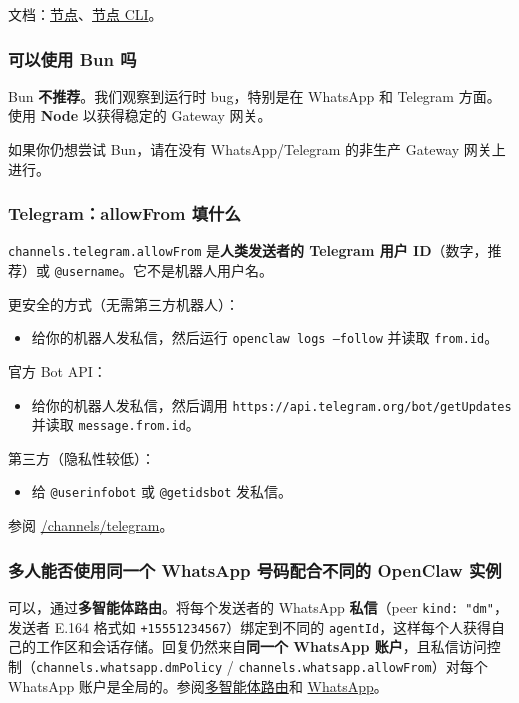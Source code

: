 文档：\href{/nodes}{节点}、\href{/cli/nodes}{节点 CLI}。

\subsubsection{可以使用 Bun 吗}


Bun \textbf{不推荐}。我们观察到运行时 bug，特别是在 WhatsApp 和 Telegram 方面。
使用 \textbf{Node} 以获得稳定的 Gateway 网关。

如果你仍想尝试 Bun，请在没有 WhatsApp/Telegram 的非生产 Gateway 网关上进行。

\subsubsection{Telegram：allowFrom 填什么}


\texttt{channels.telegram.allowFrom} 是\textbf{人类发送者的 Telegram 用户 ID}（数字，推荐）或 \texttt{@username}。它不是机器人用户名。

更安全的方式（无需第三方机器人）：

\begin{itemize}
  \item 给你的机器人发私信，然后运行 \texttt{openclaw logs --follow} 并读取 \texttt{from.id}。
\end{itemize}


官方 Bot API：

\begin{itemize}
  \item 给你的机器人发私信，然后调用 \texttt{https://api.telegram.org/bot/getUpdates} 并读取 \texttt{message.from.id}。
\end{itemize}


第三方（隐私性较低）：

\begin{itemize}
  \item 给 \texttt{@userinfobot} 或 \texttt{@getidsbot} 发私信。
\end{itemize}


参阅 \href{/channels/telegram\#access-control-dms--groups}{/channels/telegram}。

\subsubsection{多人能否使用同一个 WhatsApp 号码配合不同的 OpenClaw 实例}


可以，通过\textbf{多智能体路由}。将每个发送者的 WhatsApp \textbf{私信}（peer \texttt{kind: "dm"}，发送者 E.164 格式如 \texttt{+15551234567}）绑定到不同的 \texttt{agentId}，这样每个人获得自己的工作区和会话存储。回复仍然来自\textbf{同一个 WhatsApp 账户}，且私信访问控制（\texttt{channels.whatsapp.dmPolicy} / \texttt{channels.whatsapp.allowFrom}）对每个 WhatsApp 账户是全局的。参阅\href{/concepts/multi-agent}{多智能体路由}和 \href{/channels/whatsapp}{WhatsApp}。

